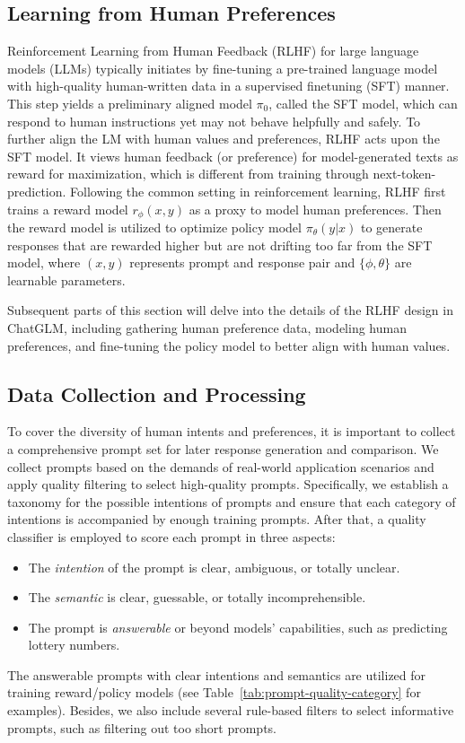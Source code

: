 \subsection{Learning from Human Preferences}
Reinforcement Learning from Human Feedback (RLHF) for large language models (LLMs) typically initiates by fine-tuning a pre-trained language model with high-quality human-written data in a supervised finetuning (SFT) manner. This step yields a preliminary aligned model $\pi_0$, called the SFT model, which can respond to human instructions yet may not behave helpfully and safely.
To further align the LM with human values and preferences, RLHF acts upon the SFT model.
It views human feedback (or preference) for model-generated texts as reward for maximization, which is different from training through next-token-prediction.
Following the common setting in reinforcement learning, RLHF first trains a reward model $r_{\phi}(x,y)$ as a proxy to model human preferences. Then the reward model is utilized to optimize policy model $\pi_{\theta}(y|x)$ to generate responses that are rewarded higher but are not drifting too far from the SFT model, where $(x, y)$ represents prompt and response pair and $\{\phi, \theta\}$ are learnable parameters.

Subsequent parts of this section will delve into the details of the RLHF design in ChatGLM, including gathering human preference data, modeling human preferences, and fine-tuning the policy model to better align with human values.

\subsection{Data Collection and Processing}

To cover the diversity of human intents and preferences, it is important to collect a comprehensive prompt set for later response generation and comparison.
We collect prompts based on the demands of real-world application scenarios and apply quality filtering to select high-quality prompts.
Specifically, we establish a taxonomy for the possible intentions of prompts and ensure that each category of intentions is accompanied by enough training prompts.
After that, a quality classifier is employed to score each prompt in three aspects:
\begin{itemize}[leftmargin=*]
    \item The \textit{intention} of the prompt is clear, ambiguous, or totally unclear.
    \item The \textit{semantic} is clear, guessable, or totally incomprehensible.
    \item The prompt is \textit{answerable} or beyond models' capabilities, such as predicting lottery numbers.
\end{itemize}
The answerable prompts with clear intentions and semantics are utilized for training reward/policy models (see Table~\ref{tab:prompt-quality-category} for examples).
Besides, we also include several rule-based filters to select informative prompts, such as filtering out too short prompts.

